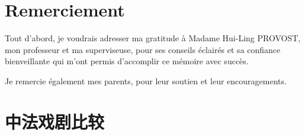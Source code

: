 \documentclass[UTF8,a4paper,12pt]{ctexart}
\numberwithin{equation}{section}
\begin{document}


%
%
%
%


\newpage
\begin{center}
{\listoffigures
\thispagestyle{fancy}
}
\end{center}


\newpage
{}

\section*{Remerciement}

\quad \quad Tout d'abord, je voudrais adresser ma gratitude à Madame Hui-Ling PROVOST, mon professeur et ma superviseuse, pour ses conseils éclairés et sa confiance bienveillante qui m'ont permis d'accomplir ce mémoire avec succès.

Je remercie également mes parents, pour leur soutien et leur encouragements.
\hspace{8mm}


\newpage
{}
\fancyhead[RH]{}
\heiti \section*{中法戏剧比较}%
\end{document}
